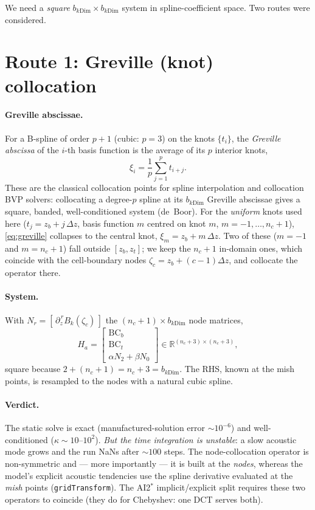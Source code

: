 \documentclass[11pt]{article}
\begin{document}
We need a \emph{square} $b_{k\mathrm{Dim}}\times b_{k\mathrm{Dim}}$ system in
spline-coefficient space. Two routes were considered.

\section{Route 1: Greville (knot) collocation}

\paragraph{Greville abscissae.} For a B-spline of order $p+1$ (cubic: $p=3$) on
the knots $\{t_i\}$, the \emph{Greville abscissa} of the $i$-th basis function is
the average of its $p$ interior knots,
\begin{equation}
  \xi_i = \frac{1}{p}\sum_{j=1}^{p} t_{i+j}.
  \label{eq:greville}
\end{equation}
These are the classical collocation points for spline interpolation and
collocation BVP solvers: collocating a degree-$p$ spline at its
$b_{k\mathrm{Dim}}$ Greville abscissae gives a square, banded, well-conditioned
system (de~Boor). For the \emph{uniform} knots used here ($t_j=z_b+j\,\Delta z$,
basis function $m$ centred on knot $m$, $m=-1,\dots,n_c+1$), \eqref{eq:greville}
collapses to the central knot, $\xi_m = z_b + m\,\Delta z$. Two of these
($m=-1$ and $m=n_c+1$) fall outside $[z_b,z_t]$; we keep the $n_c+1$ in-domain
ones, which coincide with the cell-boundary nodes $\zeta_c = z_b+(c-1)\Delta z$,
and collocate the operator there.

\paragraph{System.} With $N_r=[\,\partial_z^{\,r}B_k(\zeta_c)\,]$ the
$(n_c+1)\times b_{k\mathrm{Dim}}$ node matrices,
\begin{equation}
  H_a=\begin{bmatrix}\mathrm{BC}_b\\\mathrm{BC}_t\\ \alpha N_2+\beta N_0\end{bmatrix}
  \in\mathbb{R}^{(n_c+3)\times(n_c+3)} ,
\end{equation}
square because $2+(n_c+1)=n_c+3=b_{k\mathrm{Dim}}$. The RHS, known at the mish
points, is resampled to the nodes with a natural cubic spline.

\paragraph{Verdict.} The static solve is exact (manufactured-solution error
$\sim10^{-6}$) and well-conditioned ($\kappa\sim10$--$10^2$). \emph{But the time
integration is unstable}: a slow acoustic mode grows and the run NaNs after
$\sim100$ steps. The node-collocation operator is non-symmetric and --- more
importantly --- it is built at the \emph{nodes}, whereas the model's explicit
acoustic tendencies use the spline derivative evaluated at the \emph{mish}
points (\texttt{gridTransform}). The AI2$^\ast$ implicit/explicit split requires
these two operators to coincide (they do for Chebyshev: one DCT serves both).
\end{document}
